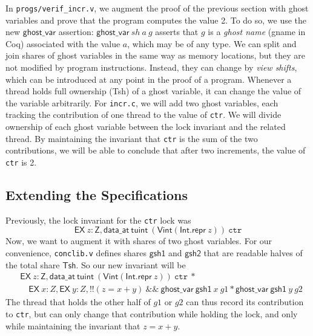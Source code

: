 \documentclass[11pt]{article} %
\begin{document}
In \texttt{progs/verif\_incr.v}, we augment the proof of the previous section with ghost variables and prove that the program computes the value 2. To do so, we use the new $\mathsf{ghost\_var}$ assertion: $\mathsf{ghost\_var}\ \mathit{sh}\ a\ g$ asserts that $g$ is a \emph{ghost name} (\textsf{gname} in Coq) associated with the value $a$, which may be of any type. We can split and join shares of ghost variables in the same way as memory locations, but they are not modified by program instructions. Instead, they can change by \emph{view shifts}, which can be introduced at any point in the proof of a program. Whenever a thread holds full ownership (\textsf{Tsh}) of a ghost variable, it can change the value of the variable arbitrarily. For \texttt{incr.c}, we will add two ghost variables, each tracking the contribution of one thread to the value of \texttt{ctr}. We will divide ownership of each ghost variable between the lock invariant and the related thread. By maintaining the invariant that \texttt{ctr} is the sum of the two contributions, we will be able to conclude that after two increments, the value of \texttt{ctr} is 2.

\subsection{Extending the Specifications}
Previously, the lock invariant for the \texttt{ctr} lock was $$\mathsf{EX}\ z : \mathsf{Z}, \mathsf{data\_at}\ \mathsf{tuint}\ (\mathsf{Vint} (\mathsf{Int.repr}\ z))\ \texttt{ctr}$$
Now, we want to augment it with shares of two ghost variables. For our convenience, \texttt{conclib.v} defines shares $\mathsf{gsh1}$ and $\mathsf{gsh2}$ that are readable halves of the total share $\mathsf{Tsh}$. So our new invariant will be
\begin{align*}&\mathsf{EX}\ z : \mathsf{Z}, \mathsf{data\_at}\ \mathsf{tuint}\ (\mathsf{Vint} (\mathsf{Int.repr}\ z))\ \texttt{ctr}\ * \\&\quad\mathsf{EX}\ x : Z, \mathsf{EX}\ y : Z, !!(z = x + y) \ \&\&\ \mathsf{ghost\_var}\ \mathsf{gsh1}\ x\ g1 * \mathsf{ghost\_var}\ \mathsf{gsh1}\ y\ g2\end{align*}
The thread that holds the other half of $g1$ or $g2$ can thus record its contribution to \texttt{ctr}, but can only change that contribution while holding the lock, and only while maintaining the invariant that $z = x + y$.
\end{document}
